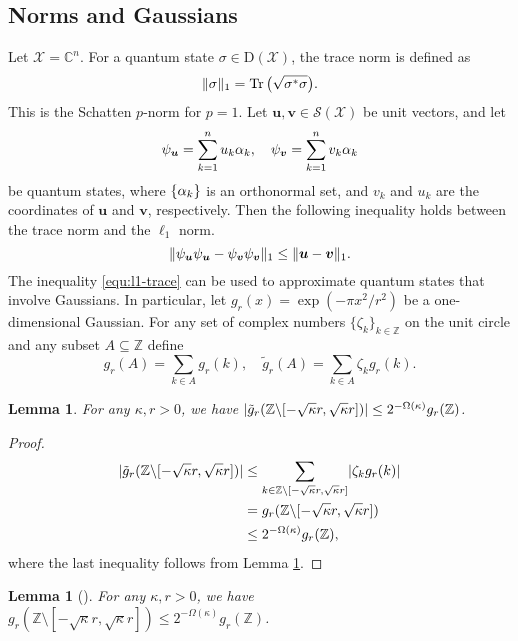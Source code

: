 \documentclass[11pt]{article}
\theoremstyle{plain}
\newtheorem{lemma}[theorem]{Lemma}
\theoremstyle{definition}
\DeclareMathOperator{\tr}{Tr} %
\DeclarePairedDelimiter{\abs}{\lvert}{\rvert}
\let\ket\relax
\DeclarePairedDelimiter{\ket}{\lvert}{\rangle}
\let\bra\relax
\DeclarePairedDelimiter{\bra}{\langle}{\rvert}
\DeclarePairedDelimiter{\opnorm}{\lVert}{\rVert}
\def\C{\mathbb{C}}
\def\Z{\mathbb{Z}}
\def\X{\mathcal{X}}
\def\SX{\mathcal{S(X)}}
\begin{document}
\subsection{Norms and Gaussians}

Let $\X = \C^n$. For a quantum state $\sigma \in \mathrm{D}(\X)$, the trace norm is defined as
\[ \opnorm{\sigma}_1 = \tr\big(\sqrt{\sigma^*\sigma}\big). \]
This is the Schatten $p$-norm for $p = 1$. Let $\bm{u}, \bm{v} \in \SX$ be unit vectors, and let
\[ \ket{\psi_{\bm{u}}} = \sum_{k = 1}^n u_k \ket{\alpha_k}, \quad \ket{\psi_{\bm{v}}} = \sum_{k = 1}^n v_k \ket{\alpha_k} \]
be quantum states, where $\{\ket{\alpha_k}\}$ is an orthonormal set, and $v_k$ and $u_k$ are the coordinates of $\bm{u}$ and $\bm{v}$, respectively. Then the following inequality holds between the trace norm and the $\ell_1$ norm.
\begin{equation}
    \label{equ:l1-trace}
    \opnorm{\ket{\psi_{\bm{u}}}\bra{\psi_{\bm{u}}} - \ket{\psi_{\bm{v}}}\bra{\psi_{\bm{v}}}}_1 \le \opnorm{\bm{u} - \bm{v}}_1.
\end{equation}
The inequality \eqref{equ:l1-trace} can be used to approximate quantum states that involve Gaussians. In particular, let $g_r(x) = \exp(-\pi x^2 / r^2)$ be a one-dimensional Gaussian. For any set of complex numbers $\{\zeta_k\}_{k \in \Z}$ on the unit circle and any subset $A \subseteq \Z$ define
\[ g_r(A) = \sum_{k \in A}g_r(k), \quad  \tilde{g}_r(A) = \sum_{k \in A} \zeta_k g_r(k). \]
\begin{lemma}
    \label{lem:trfr-bound-c}
    For any $\kappa, r > 0$, we have $\abs{\tilde{g}_r(\Z {\setminus} [-\sqrt{\kappa}r, \sqrt{\kappa}r])} \le 2^{-\Omega(\kappa)} g_r(\Z)$. 
\end{lemma}
\begin{proof}
    \begin{align*}
        \abs{\tilde{g}_r(\Z {\setminus} [-\sqrt{\kappa}r, \sqrt{\kappa}r])}
        & \le \sum_{k \in \Z {\setminus} [-\sqrt{\kappa}r, \sqrt{\kappa}r]} \abs{\zeta_k g_r(k)} \\
        & = g_r(\Z {\setminus} [-\sqrt{\kappa}r, \sqrt{\kappa}r]) \\
        & \le 2^{-\Omega(\kappa)} g_r(\Z),
    \end{align*}
    where the last inequality follows from Lemma \ref{lem:trfr-bound}.
\end{proof}
\begin{lemma}[{\cite[Lemma 1]{brakerski2018learning}}]
    \label{lem:trfr-bound}
    For any $\kappa, r > 0$, we have $g_r(\Z {\setminus} [-\sqrt{\kappa}r, \sqrt{\kappa}r]) \le 2^{-\Omega(\kappa)} g_r(\Z)$. 
\end{lemma}
\end{document}
